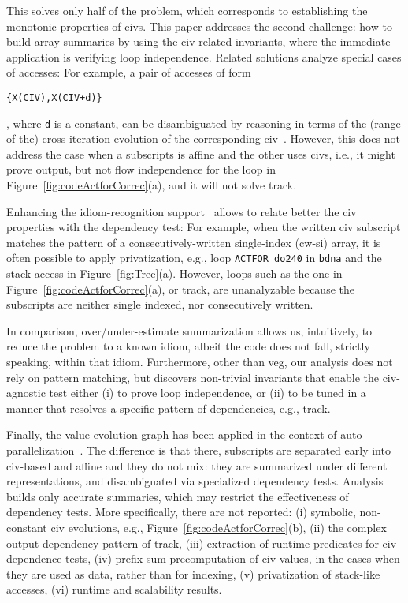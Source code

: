 \documentclass[10pt,nocopyrightspace]{sigplanconf}
\begin{document}
This solves only half of the problem, which   
corresponds to establishing the monotonic properties of {\sc civ}s.
This paper addresses the second challenge: 
how to build array summaries by using the {\sc civ}-related invariants,
where the immediate application is verifying loop independence. 
Related solutions analyze special cases of accesses:
%
For example, a pair of accesses of form  
\begin{small}{\tt\{X(CIV),X(CIV+d)\}}\end{small}, where {\tt d} is a constant,
can be disambiguated by reasoning in terms of the (range of the) cross-iteration 
evolution of the corresponding {\sc civ}~\cite{CohenBeyondMon}.
%
However, this does not address the case when a subscripts is affine
and the other uses {\sc civ}s, i.e., it might prove output, but not 
flow independence for the loop in Figure~\ref{fig:codeActforCorrec}(a), 
and it will not solve {\sc track}. 

Enhancing the idiom-recognition support~\cite{PaduaDemDrInterproc} 
allows to relate better the {\sc civ} properties with the dependency test: 
For example, when the written {\sc civ} subscript matches the pattern 
of a consecutively-written single-index ({\sc cw-si}) array, it is often
possible to apply privatization, e.g., loop {\tt ACTFOR\_do240} in {\tt bdna}
and the stack access in Figure~\ref{fig:Tree}(a). 
%
However, loops such as the one in Figure~\ref{fig:codeActforCorrec}(a),
or {\sc track}, are unanalyzable because the subscripts are neither single 
indexed, nor consecutively written.  

In comparison, over/under-estimate summarization allows us,
intuitively, to reduce the problem to a known idiom, albeit
the code does not fall, strictly speaking, within that idiom.
Furthermore, other than {\sc veg}, our analysis does not rely
on pattern matching, but discovers non-trivial invariants that
enable the {\sc civ}-agnostic test either (i) to prove loop independence,
or (ii) to be tuned in a manner that resolves a specific pattern 
of dependencies, e.g., {\sc track}.

Finally, the value-evolution graph has been applied in the context of 
auto-parallelization~\cite{VEG}.   The difference is that there, 
subscripts are separated early into {\sc civ}-based and affine and they 
do not mix: they are summarized under different representations, 
and disambiguated via specialized dependency tests.
Analysis builds only accurate summaries, which may restrict the
effectiveness of dependency tests. 
More specifically, there are not reported:
  (i)   symbolic, non-constant {\sc civ} evolutions,
        e.g., Figure~\ref{fig:codeActforCorrec}(b),
 (ii) the complex output-dependency pattern of {\sc track},
(iii) extraction of runtime predicates for {\sc civ}-dependence tests,
 (iv) prefix-sum precomputation of {\sc civ} values, in the
        cases when they are used as data, rather than for indexing,
  (v) privatization of stack-like accesses, 
 (vi) runtime and scalability results.
\end{document}
